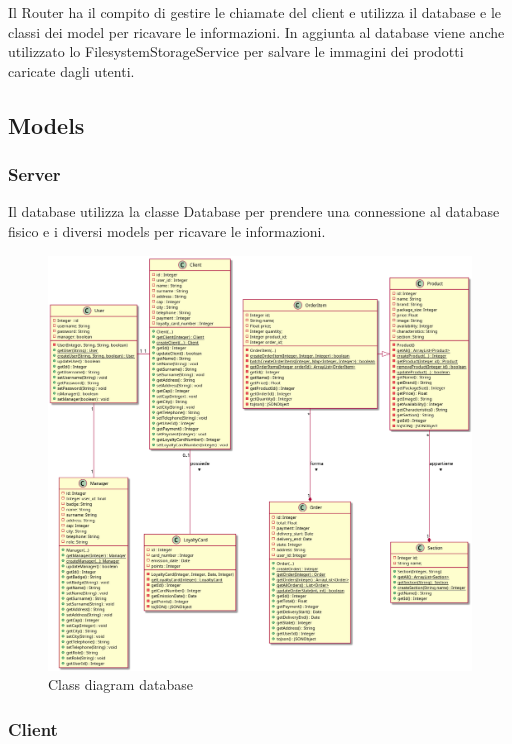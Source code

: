 \documentclass[12pt, a4paper]{report}
\begin{document}
Il Router ha il compito di gestire le chiamate del client e utilizza il
database e le classi dei model per ricavare le informazioni. In aggiunta al
database viene anche utilizzato lo FilesystemStorageService per salvare le
immagini dei prodotti caricate dagli utenti.

\newpage

\subsection{Models}

\subsubsection{Server}

Il database utilizza la classe Database per prendere una con\-nes\-sio\-ne al
da\-ta\-ba\-se fisico e i diversi models per ricavare le informazioni.

\begin{figure}[h]
  \centering
  \includegraphics[width=\textwidth]{database_models_class.png}
  \caption{Class diagram database}
\end{figure}

\newpage

\subsubsection{Client}
\end{document}
